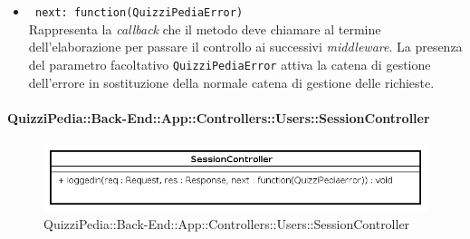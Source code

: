 \begin{itemize}
\begin{itemize}
\begin{itemize}
		  \item
			\texttt{ next: function(QuizziPediaError)} \\
			Rappresenta la \textit{callback} che il metodo deve chiamare al termine dell'elaborazione per passare il controllo ai successivi \textit{middleware}. La presenza del parametro facoltativo \texttt{QuizziPediaError} attiva la catena di gestione dell'errore in sostituzione della normale catena di gestione delle richieste.		 	
		 \end{itemize} 	 		
	\end{itemize}	
\end{itemize}	
\paragraph{QuizziPedia::Back-End::App::Controllers::Users::SessionController}
\label{QuizziPedia::Back-End::App::Controllers::Users::SessionController}
\begin{figure}[ht]
	\centering
	\includegraphics[scale=0.45]{UML/Classi/Back-End/QuizziPedia_Back-End_App_Controllers_Users_SessionController.png}
	\caption{QuizziPedia::Back-End::App::Controllers::Users::SessionController}
\end{figure}
\FloatBarrier
